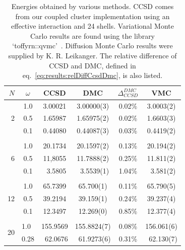 \begin{table}
\begin{center}
\caption{
Energies obtained by various methods. 
CCSD comes from our coupled cluster implementation using an effective interaction and 24 shells. 
Variational Monte Carlo results are found using the library `toffyrn::qvmc'~\cite{toffyrn::qvmc}. 
Diffusion Monte Carlo results were supplied by K. R. Leikanger.
The relative difference of CCSD and DMC, defined in eq.~\eqref{eq:results:relDiffCcsdDmc}, is also listed.
}
\label{tab:results:otherMethods}
\begin{tabular}{rc|ccc|c}
$N$ & $\omega$ & CCSD & DMC  & $\Delta_{CCSD}^{DMC}$ & VMC \\
\hline \hline
   & 1.0   &  3.00021 &  3.00000(3) & 0.02\%  & 3.0003(2)  \\
2  & 0.5   &  1.65987 &  1.65975(2) & 0.02\%  & 1.6603(3)  \\
   & 0.1   &  0.44080 &  0.44087(3) & 0.03\%  & 0.4419(2)  \\
& & & & \\                                                 
   & 1.0   & 20.1734  & 20.1597(2)  & 0.13\%  & 20.194(2)  \\
6  & 0.5   & 11,8055  & 11.7888(2)  & 0.25\%  & 11.811(2)  \\
   & 0.1   & ~3.5805  & ~3.5539(1)  & 1.04\%  & ~3.581(2)  \\
& & & & \\                                                 
   & 1.0   & 65.7399  & 65.700(1)   & 0.11\%  & 65.790(5)  \\
12 & 0.5   & 39.2194  & 39.159(1)   & 0.24\%  & 39.237(4)  \\
   & 0.1   & 12.3497  & 12.269(0)   & 0.85\%  & 12.377(4)  \\
& & & & \\                                                 
\multirow{2}{*}{20} 
   & 1.0~  & 155.9569 & 155.8824(7)  & 0.08\%  & 156.061(6)  \\
   & 0.28  & ~62.0676 & ~61.9273(6)  & 0.31\%  & ~62.130(7)  \\
\hline \hline
\end{tabular}
\end{center}
\end{table}

